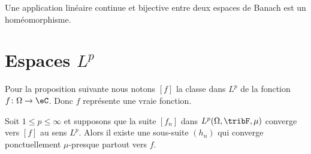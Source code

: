 

\begin{theorem}  \label{ThofQShsw}
    Une application linéaire continue et bijective entre deux espaces de Banach est un homéomorphisme.
\end{theorem}

\section{Espaces \texorpdfstring{$L^p$}{Lp}}

Pour la proposition suivante nous notons \( [f]\) la classe dans \( L^p\) de la fonction \( f\colon \Omega\to \eC\). Donc \( f\) représente une vraie fonction.
\begin{proposition}  \label{PropWoywYG}
    Soit \( 1\leq p\leq \infty\) et supposons que la suite \( [f_n]\) dans \( L^p(\Omega,\tribF,\mu)\) converge vers \( [f]\) au sens \( L^p\). Alors il existe une sous-suite \( (h_n)\) qui converge ponctuellement \( \mu\)-presque partout vers \( f\).
\end{proposition}

